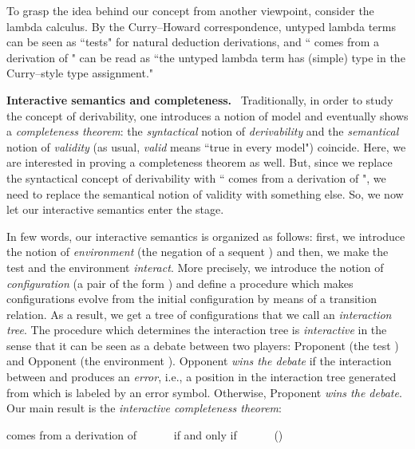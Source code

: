 \documentclass[copyright,creativecommons]{eptcs}
\def\ie{i.e., }
\newcommand{\cT}{\mathcal{T}}
\newcommand{\bS}{\mathbf{S}}
\theoremstyle{definition}
\newcommand{\squishlist}{
 \begin{list}{}
  { \setlength{\itemsep}{0pt}
     \setlength{\parsep}{3pt}
     \setlength{\topsep}{3pt}
     \setlength{\partopsep}{0pt}
     \setlength{\leftmargin}{1em}
     \setlength{\labelwidth}{1.5em}
     \setlength{\labelsep}{0.5em} } }
\newcommand{\squishend}{
  \end{list}  }
\begin{document}
To grasp the idea behind our  concept from another  viewpoint, consider the lambda calculus. By the Curry--Howard correspondence, untyped  lambda terms can be seen as ``tests"
for  natural deduction derivations, and  `` comes from a derivation
of \/"
 can be read  as ``the untyped lambda term 
has (simple) type   in the Curry--style type assignment."\\
\vspace{-0.35cm}








 \noindent \textbf{Interactive semantics and completeness.} \
Traditionally, in order to study   the concept of derivability,   one  introduces a notion of model and eventually shows a \emph{completeness
theorem}:  the \emph{syntactical} notion of \emph{derivability}
and the \emph{semantical} notion  of \emph{validity}
(as usual, \emph{valid} means ``true in every model")
coincide. Here, we are interested in
proving a completeness theorem as well.
But, since we   replace the syntactical concept of derivability
with `` comes from a derivation
of \/", we   need to replace the semantical notion  of  validity with something else.
So, we now let our interactive semantics enter the stage.

In few words, our interactive semantics is organized as follows: first, we introduce the notion
of \emph{environment}  (the  negation  of a  sequent ) and then,
we make the test  and the environment  \emph{interact}.
More precisely, we  introduce the notion of \emph{configuration} (a pair of the form ) and define a procedure which makes configurations evolve from the initial configuration  by means of
a  transition relation. As a result, we get a tree of configurations
that we call an \emph{interaction tree}.
The procedure which determines
the interaction tree is \emph{interactive} in the sense
that it can be seen as a debate
between two players: Proponent  (the test )
and   Opponent (the environment ).
Opponent  \emph{wins the debate} if  the interaction between  and  produces
 an
\emph{error}, \ie a position
in the interaction tree generated  from   which is labeled by an  error symbol. Otherwise, Proponent \emph{wins the debate}. Our main result is the \emph{interactive completeness theorem}:
\vspace{-0.1cm}
\squishlist
\item[] {\centering
 comes from a derivation  of  \ \ \ \ \ \ if and only if \ \ \ \ \ \ \cT\neg \bS \hfill () \par}
\squishend
\end{document}
